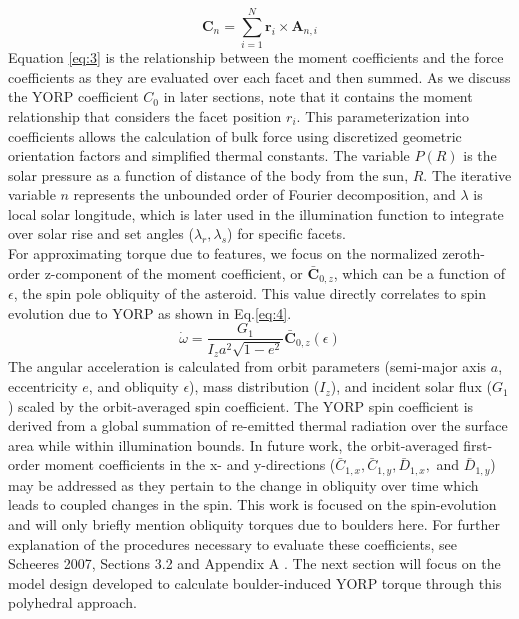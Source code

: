 \begin{equation}\label{eq:3}
    \mathbf{C}_n = \sum_{i=1}^{N} \mathbf{r}_i \times \mathbf{A}_{n,i}
\end{equation}
Equation \ref{eq:3} is the relationship between the moment coefficients and the force coefficients as they are evaluated over each facet and then summed. As we discuss the YORP coefficient $C_{0}$ in later sections, note that it contains the moment relationship that considers the facet position $r_i$.
This parameterization into coefficients allows the calculation of bulk force using discretized geometric orientation factors and simplified thermal constants. The variable $P(R)$ is the solar pressure as a function of distance of the body from the sun, $R$. The iterative variable $n$ represents the unbounded order of Fourier decomposition, and $\lambda$ is local solar longitude, which is later used in the illumination function to integrate over solar rise and set angles ($\lambda_r, \lambda_s$) for specific facets. 
\\ \indent 
For approximating torque due to features, we focus on the normalized zeroth-order z-component of the moment coefficient, or $\bar{\textbf{C}}_{0,z}$, which can be a function of $\epsilon$, the spin pole obliquity of the asteroid. This value directly correlates to spin evolution due to YORP as shown in Eq.\ref{eq:4}. 
\begin{equation}\label{eq:4}
    \dot{\omega} = \frac{G_1}{I_z a^2 \sqrt{1-e^2}} \bar{\textbf{C}}_{0,z}(\epsilon)
\end{equation}
The angular acceleration is calculated from orbit parameters (semi-major axis $a$, eccentricity $e$, and obliquity $\epsilon$), mass distribution ($I_z$), and incident solar flux ($G_1$) scaled by the orbit-averaged spin coefficient. The YORP spin coefficient is derived from a global summation of re-emitted thermal radiation over the surface area while within illumination bounds. In future work, the orbit-averaged first-order moment coefficients in the x- and y-directions ($\bar{C}_{1,x}, \bar{C}_{1,y}, \bar{D}_{1,x},$ and $\bar{D}_{1,y}$) may be addressed as they pertain to the change in obliquity over time which leads to coupled changes in the spin. This work is focused on the spin-evolution and will only briefly mention obliquity torques due to boulders here. 
 For further explanation of the procedures necessary to evaluate these coefficients, see Scheeres 2007, Sections 3.2 and Appendix A \cite{Scheeres2007}. The next section will focus on the model design developed to calculate boulder-induced YORP torque through this polyhedral approach. 

